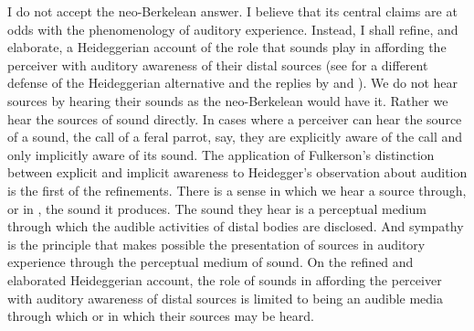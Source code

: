 I do not accept the neo-Berkelean answer. I believe that its central claims are at odds with the phenomenology of auditory experience. Instead, I shall refine, and elaborate, a Heideggerian account of the role that sounds play in affording the perceiver with auditory awareness of their distal sources (see \citealt{Leddington:2014aa} for a different defense of the Heideggerian alternative and the replies by \citealt{OCallaghan:2014aa} and \citealt{Nudds:2014aa}). We do not hear sources by hearing their sounds as the neo-Berkelean would have it. Rather we hear the sources of sound directly. In cases where a perceiver can hear the source of a sound, the call of a feral parrot, say, they are explicitly aware of the call and only implicitly aware of its sound. The application of Fulkerson's \citeyearpar{Fulkerson:2014ek} distinction between explicit and implicit awareness to Heidegger's \citeyearpar{Heidegger:1935uq} observation about audition is the first of the refinements. There is a sense in which we hear a source through, or in \citep{Leddington:2014aa}, the sound it produces. The sound they hear is a perceptual medium through which the audible activities of distal bodies are disclosed. And sympathy is the principle that makes possible the presentation of sources in auditory experience through the perceptual medium of sound. On the refined and elaborated Heideggerian account, the role of sounds in affording the perceiver with auditory awareness of distal sources is limited to being an audible media through which or in which their sources may be heard.



